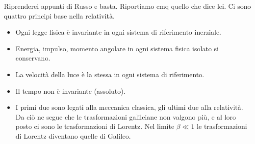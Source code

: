 Riprenderei appunti di Russo e basta. Riportiamo cmq quello che dice lei.
Ci sono quattro principi base nella relatività.
\begin{itemize}
    \item Ogni legge fisica è invariante in ogni sistema di riferimento inerziale.
    \item Energia, impulso, momento angolare in ogni sistema fisica isolato si conservano.
    \item La velocità della luce è la stessa in ogni sistema di riferimento.
    \item Il tempo non è invariante (assoluto).
    \item I primi due sono legati alla meccanica classica, gli ultimi due alla relatività. Da ciò ne segue che le trasformazioni galileiane non valgono più, e al loro posto ci sono le trasformazioni di Lorentz. Nel limite $\beta\ll1$ le trasformazioni di Lorentz diventano quelle di Galileo.
\end{itemize}
